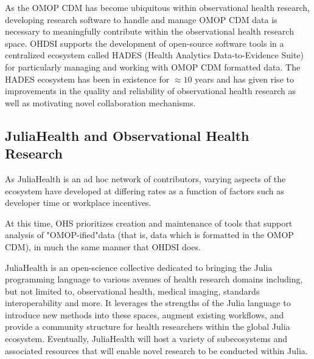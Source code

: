 \documentclass{juliacon}
\begin{document}
As the OMOP CDM has become ubiquitous within observational health research, developing research software to handle and manage OMOP CDM data is necessary to meaningfully contribute within the observational health research space.
OHDSI supports the development of open-source software tools in a centralized ecosystem called HADES (Health Analytics Data-to-Evidence Suite) for particularly managing and working with OMOP CDM formatted data.
The HADES ecosystem has been in existence for $\approx 10$ years and has given rise to improvements in the quality and reliability of observational health research as well as motivating novel collaboration mechanisms.

\subsection{JuliaHealth and Observational Health Research}

As JuliaHealth is an ad hoc network of contributors, varying aspects of the ecosystem have developed at differing rates as a function of factors such as developer time or workplace incentives.

At this time, OHS prioritizes creation and maintenance of tools that support analysis of "OMOP-ified"\footnotemark data (that is, data which is formatted in the OMOP CDM), in much the same manner that OHDSI does.


JuliaHealth is an open-science collective dedicated to bringing the Julia programming language to various avenues of health research domains including, but not limited to, observational health, medical imaging, standards interoperability and more.
It leverages the strengths of the Julia language to introduce new methods into these spaces, augment existing workflows, and provide a community structure for health researchers within the global Julia ecosystem.
Eventually, JuliaHealth will host a variety of subecosystems and associated resources that will enable novel research to be conducted within Julia. 
\end{document}
